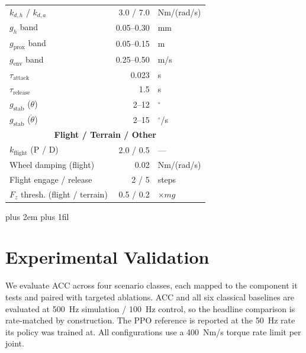 \documentclass[conference]{IEEEtran}
\newcommand{\tabnote}{\par\leftskip=0pt\rightskip=0pt plus 2em%
  \parfillskip=0pt plus 1fil\relax}
\begin{document}
\begin{table}[t]
\begin{tabular}{@{}p{2.8cm}rp{1.8cm}@{}}
$k_{d,h}$ / $k_{d,a}$      & 3.0 / 7.0 & Nm/(rad/s) \\
$g_h$ band                 & 0.05--0.30 & mm \\
$g_{\text{prox}}$ band     & 0.05--0.15 & m \\
$g_{\text{env}}$ band      & 0.25--0.50 & m/s \\
$\tau_{\text{attack}}$     & 0.023   & s \\
$\tau_{\text{release}}$    & 1.5     & s \\
$g_{\text{stab}}$ ($\theta$) & 2--12  & $^\circ$ \\
$g_{\text{stab}}$ ($\dot{\theta}$) & 2--15 & $^\circ$/s \\
\midrule
\multicolumn{3}{c}{\textbf{Flight / Terrain / Other}} \\
\midrule
$k_{\text{flight}}$ (P / D)& 2.0 / 0.5 & --- \\
Wheel damping (flight)     & 0.02    & Nm/(rad/s) \\
Flight engage / release    & 2 / 5   & steps \\
\makecell[l]{$F_z$ thresh.\\(flight / terrain)} & 0.5 / 0.2 & $\times mg$ \\
\bottomrule
\end{tabular}
\vspace{2pt}\tabnote\noindent
\end{table}

\section{Experimental Validation}
\label{sec:results}

We evaluate ACC across four scenario classes, each mapped to the component it tests and paired with targeted ablations.
ACC and all six classical baselines are evaluated at \SI{500}{Hz} simulation / \SI{100}{Hz} control, so the headline comparison is rate-matched by construction. The PPO reference is reported at the \SI{50}{Hz} rate its policy was trained at. All configurations use a \SI{400}{Nm/s} torque rate limit per joint.
\end{document}
